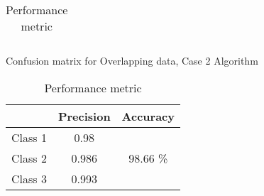 \documentclass[11pt,paper=a4,answers]{exam}
\begin{document}
\begin{questions}
\begin{enumerate}[i.]
\begin{enumerate}
\begin{table}[ht]
\begin{tabular}{c | c c c c | c | c |}
                    \end{tabular}
                    \caption{Confusion matrix for Overlapping data, Case 2 Algorithm}
                    \label{tab:d3con2}
                \endminipage\hfill
                    \begin{tabular}{| l | c | c |}
                        \hline
                        & Precision & Accuracy\\
                        \hline
                        Class 1 & 0.98 & \\
                        \cline{1-2}
                        Class 2 & 0.986 & 98.66 \%\\
                        \cline{1-2}
                        Class 3 & 0.993 & \\
                        \hline
                    \end{tabular}
                    \caption{Performance metric}
                \endminipage\hfill
            \end{table}\\


\end{enumerate}
\end{enumerate}
\end{questions}
\end{document}
